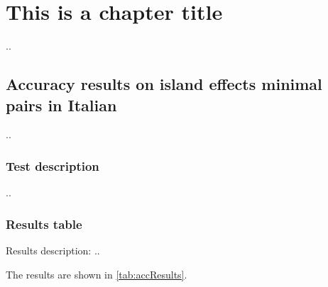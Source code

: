 \chapter{This is a chapter title}

..

\section{Accuracy results on island effects minimal pairs in Italian}

..

\subsection{Test description}

..

\subsection{Results table}

Results description: ..

The results are shown in \autoref{tab:accResults}.


